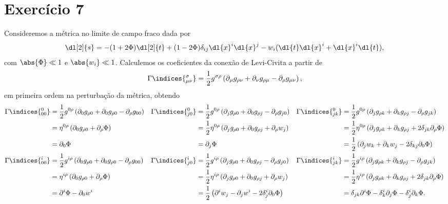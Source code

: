 \section*{Exercício 7}
Consideremos a métrica no limite de campo fraco dada por
\begin{equation*}
    \dl[2]{s} = -(1 + 2\Phi) \dl[2]{t} + (1 - 2\Phi)\delta_{ij} \dl{x}^i \dl{x}^j- w_i(\dl{t}\dl{x}^i + \dl{x}^i \dl{t}),
\end{equation*}
com \(\abs{\Phi} \ll 1\) e \(\abs{w_i} \ll 1\).
Calculemos os coeficientes da conexão de Levi-Civita a partir de
\begin{equation*}
    \Gamma\indices{^\sigma_{\mu\nu}} = \frac12 g^{\sigma \rho}\left(\partial_\mu g_{\rho \nu} + \partial_\nu g_{\rho \mu} - \partial_\rho g_{\mu\nu}\right),
\end{equation*}
em primeira ordem na perturbação da métrica, obtendo
\begin{align*}
    \Gamma\indices{^0_{00}} &= \frac12 g^{0\rho} \left(\partial_0 g_{\rho 0}  + \partial_0 g_{\rho 0} - \partial_\rho g_{00}\right)&
    \Gamma\indices{^0_{j0}} &= \frac12 g^{0\rho} \left(\partial_j g_{\rho0} + \partial_0 g_{\rho j} - \partial_\rho g_{j0}\right)&
    \Gamma\indices{^0_{jk}} &= \frac12 g^{0\rho} \left(\partial_j g_{\rho k} + \partial_k g_{\rho j} - \partial_\rho g_{jk}\right)\\
                            &= \eta^{0\rho}\left(\partial_0g_{\rho 0} + \partial_\rho\Phi\right)&
                            &= \frac12 \eta^{0\rho}\left(\partial_j g_{\rho 0} + \partial_0 g_{\rho j} + \partial_\rho w_j\right)&
                            &= \frac12 \eta^{0\rho}\left(\partial_j g_{\rho k} + \partial_k g_{\rho j} + 2 \delta_{jk}\partial_\rho \Phi\right)\\
                            &= \partial_0 \Phi&
                            &=\partial_j \Phi&
                            &= \frac12 \left(\partial_j w_k + \partial_k w_j - 2 \delta_{kj} \partial_0 \Phi\right)\\
    \Gamma\indices{^i_{00}} &= \frac12 g^{i\rho} \left(\partial_0 g_{\rho 0}  + \partial_0 g_{\rho 0} - \partial_\rho g_{00}\right)&
    \Gamma\indices{^i_{j0}} &= \frac12 g^{i\rho} \left(\partial_j g_{\rho0} + \partial_0 g_{\rho j} - \partial_\rho g_{j0}\right)&
    \Gamma\indices{^i_{jk}} &= \frac12 g^{i\rho} \left(\partial_j g_{\rho k} + \partial_k g_{\rho j} - \partial_\rho g_{jk}\right)\\
                            &= \eta^{i\rho}\left(\partial_0g_{\rho 0} + \partial_\rho\Phi\right)&
                            &= \frac12 \eta^{i\rho}\left(\partial_j g_{\rho 0} + \partial_0 g_{\rho j} + \partial_\rho w_j\right)&
                            &= \frac12 \eta^{i\rho}\left(\partial_j g_{\rho k} + \partial_k g_{\rho j} + 2 \delta_{jk}\partial_\rho \Phi\right)\\
                            &= \partial^i \Phi-\partial_0 w^i&
                            &= \frac12\left(\partial^i w_j - \partial_j w^i - 2\delta^i_{j}\partial_0 \Phi\right)&
                            &= \delta_{jk} \partial^i \Phi-\delta^i_{k}\partial_j \Phi - \delta^i_{j}\partial_k \Phi.
\end{align*}

